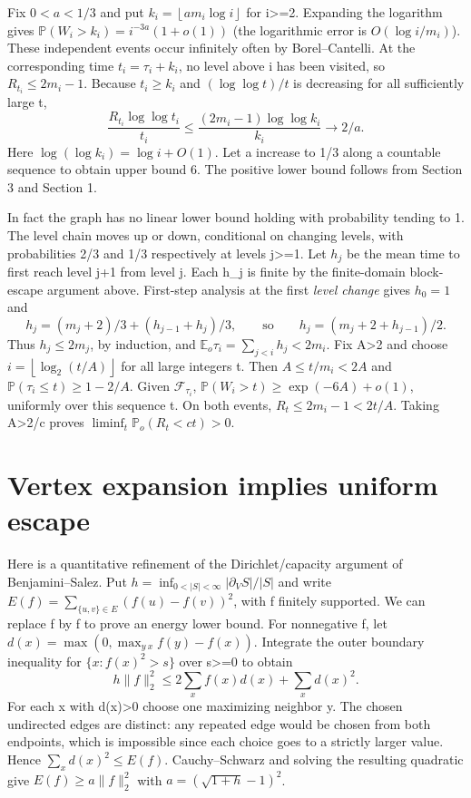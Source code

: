 \documentclass[11pt]{article}
\begin{document}
Fix \(0<a<1/3\) and put \(k_i=\left\lfloor a m_i \log  i\right\rfloor\) for i\textgreater=2. Expanding the logarithm gives \(\mathbb{P}(W_i>k_i)=i^{-3a}(1+o(1))\) (the logarithmic error is \(O(\log  i/m_i)\)). These independent events occur infinitely often by Borel--Cantelli. At the corresponding time \(t_i=\tau _i+k_i\), no level above i has been visited, so \(R_{t_i}\le 2m_i-1\). Because \(t_i\ge k_i\) and \((\log  \log  t)/t\) is decreasing for all sufficiently large t,
\[
\frac{R_{t_i}\log\log t_i}{t_i}\le
\frac{(2m_i-1)\log\log k_i}{k_i}\longrightarrow 2/a.
\]
Here \(\log (\log  k_i)=\log  i+O(1)\). Let a increase to 1/3 along a countable sequence to obtain upper bound 6. The positive lower bound follows from Section 3 and Section 1.

In fact the graph has no linear lower bound holding with probability tending to 1. The level chain moves up or down, conditional on changing levels, with probabilities 2/3 and 1/3 respectively at levels j\textgreater=1. Let \(h_j\) be the mean time to first reach level j+1 from level j. Each h\_j is finite by the finite-domain block-escape argument above. First-step analysis at the first \emph{level change} gives \(h_0=1\) and
\[
h_j=(m_j+2)/3+(h_{j-1}+h_j)/3,
\qquad\text{so}\qquad h_j=(m_j+2+h_{j-1})/2.
\]
Thus \(h_j\le 2m_j\), by induction, and \(\mathbb{E}_o \tau _i=\sum _{j<i}h_j<2m_i\). Fix A\textgreater2 and choose \(i=\left\lfloor \log _2(t/A)\right\rfloor\) for all large integers t. Then \(A\le t/m_i<2A\) and \(\mathbb{P}(\tau _i\le t)\ge 1-2/A\). Given \(\mathcal{F}_{\tau _i}\), \(\mathbb{P}(W_i>t)\ge \exp (-6A)+o(1)\), uniformly over this sequence t. On both events, \(R_t\le 2m_i-1<2t/A\). Taking A\textgreater2/c proves \(\liminf_t \mathbb{P}_o(R_t<ct)>0\).

\section{Vertex expansion implies uniform escape}\label{vertex-expansion-implies-uniform-escape}

Here is a quantitative refinement of the Dirichlet/capacity argument of Benjamini--Salez. Put \(h=\inf_{0<|S|<\infty}|\partial_V S|/|S|\) and write \(E(f)=\sum_{\{u,v\}\in E}(f(u)-f(v))^2\), with f finitely supported. We can replace f by \textbar f\textbar{} to prove an energy lower bound. For nonnegative f, let \(d(x)=\max (0,\max _{y~x}f(y)-f(x))\). Integrate the outer boundary inequality for \(\{x:f(x)^2>s\}\) over s\textgreater=0 to obtain
\[
h\|f\|_2^2\le 2\sum_x f(x)d(x)+\sum_x d(x)^2.
\]
For each x with d(x)\textgreater0 choose one maximizing neighbor y. The chosen undirected edges are distinct: any repeated edge would be chosen from both endpoints, which is impossible since each choice goes to a strictly larger value. Hence \(\sum _x d(x)^2\le E(f)\). Cauchy--Schwarz and solving the resulting quadratic give \(E(f)\ge a\lVert f\rVert_2^2\) with \(a=(\sqrt{1+h}-1)^2\).
\end{document}
